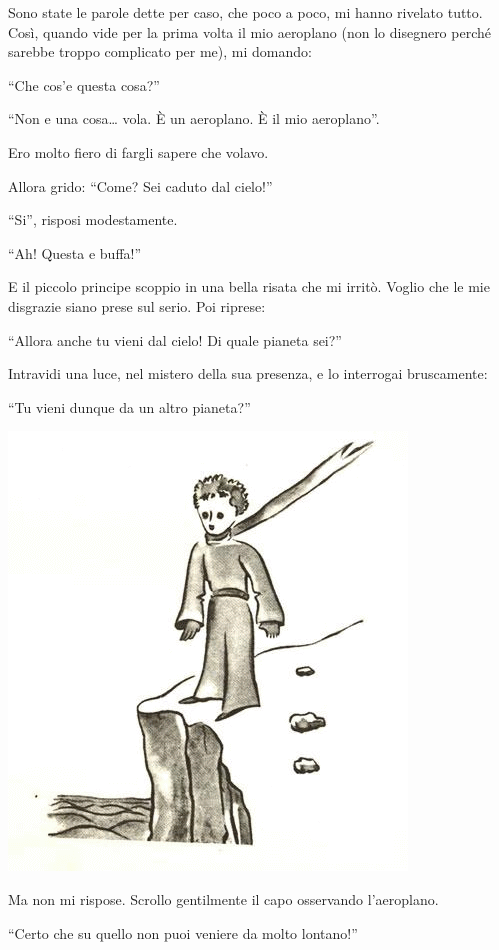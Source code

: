 \documentclass[11pt]{scrbook}
\begin{document}
Sono state le parole dette per caso, che poco a poco, mi hanno rivelato
tutto. Così, quando vide per la prima volta il mio aeroplano (non lo
disegnero perché sarebbe troppo complicato per me), mi domando:

``Che cos'e questa cosa?''

``Non e una cosa\ldots{} vola. È un aeroplano. È il mio aeroplano''.

Ero molto fiero di fargli sapere che volavo.

Allora grido: ``Come? Sei caduto dal cielo!''

``Si'', risposi modestamente.

``Ah! Questa e buffa!''

E il piccolo principe scoppio in una bella risata che mi irritò. Voglio
che le mie disgrazie siano prese sul serio. Poi riprese:

``Allora anche tu vieni dal cielo! Di quale pianeta sei?''

Intravidi una luce, nel mistero della sua presenza, e lo interrogai
bruscamente:

``Tu vieni dunque da un altro pianeta?''

\begin{center}
\includegraphics{./img/3a.png}
\end{center}

Ma non mi rispose. Scrollo gentilmente il capo osservando l'aeroplano.

``Certo che su quello non puoi veniere da molto lontano!''
\end{document}
